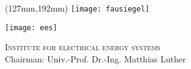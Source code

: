 \begin{titlepage}
	\thispagestyle{empty}

	\begin{textblock*}{\textwidth}(127mm,192mm)
	\texttt{[image: fausiegel]}
	\end{textblock*}

	\begin{minipage}[]{47mm}
		\texttt{[image: ees]}
	\end{minipage}
	\begin{minipage}[]{.7\textwidth}
		\raggedleft
		\textsc{Institute for electrical energy systems}\\ %
		Chairman: Univ.-Prof. Dr.-Ing. Matthias Luther
	\end{minipage}
	

	\vspace{20mm}

	\begin{center}
		\doublespacing
		\vspace*{35mm}	
		\begin{minipage}{.9\textwidth}
			\centering
			{\Large{\titel}}
		\end{minipage}																				\\
		\vspace*{10mm}		{\textbf{\MakeUppercase{\arbeit}}}										\\
		\onehalfspacing
		\vfill
		\vspace*{15mm}	    \langvon															\\
		\vspace*{3mm}		{\large\textbf \autor}												\\
		\vspace*{12mm}	    \datumAbgabe														\\
	\end{center}
	
	\vspace{15mm}
	\restoregeometry
\end{titlepage}